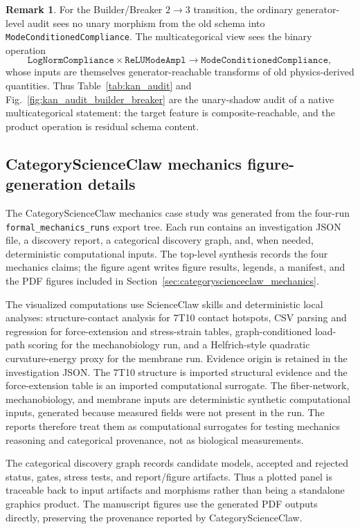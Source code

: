 \documentclass[11pt]{article}
\theoremstyle{definition}
\newtheorem{remark}{Remark}
\begin{document}
\begin{remark}
For the Builder/Breaker $2\to3$ transition, the ordinary generator-level audit sees no unary morphism from the old schema into \texttt{ModeConditionedCompliance}. The multicategorical view sees the binary operation
\[
\texttt{LogNormCompliance}\times\texttt{ReLUModeAmpl}
\longrightarrow \texttt{ModeConditionedCompliance},
\]
whose inputs are themselves generator-reachable transforms of old physics-derived quantities. Thus Table~\ref{tab:kan_audit} and Fig.~\ref{fig:kan_audit_builder_breaker} are the unary-shadow audit of a native multicategorical statement: the target feature is composite-reachable, and the product operation is residual schema content.
\end{remark}


\subsection{CategoryScienceClaw mechanics figure-generation details}
\label{sec:categoryscienceclaw_methods}

The CategoryScienceClaw mechanics case study was generated from the four-run \texttt{formal\_mechanics\_runs} export tree. Each run contains an investigation JSON file, a discovery report, a categorical discovery graph, and, when needed, deterministic computational inputs. The top-level synthesis records the four mechanics claims; the figure agent writes figure results, legends, a manifest, and the PDF figures included in Section~\ref{sec:categoryscienceclaw_mechanics}.

The visualized computations use ScienceClaw skills and deterministic local analyses: structure-contact analysis for 7T10 contact hotspots, CSV parsing and regression for force-extension and stress-strain tables, graph-conditioned load-path scoring for the mechanobiology run, and a Helfrich-style quadratic curvature-energy proxy for the membrane run. Evidence origin is retained in the investigation JSON. The 7T10 structure is imported structural evidence and the force-extension table is an imported computational surrogate. The fiber-network, mechanobiology, and membrane inputs are deterministic synthetic computational inputs, generated because measured fields were not present in the run. The reports therefore treat them as computational surrogates for testing mechanics reasoning and categorical provenance, not as biological measurements.

The categorical discovery graph records candidate models, accepted and rejected status, gates, stress tests, and report/figure artifacts. Thus a plotted panel is traceable back to input artifacts and morphisms rather than being a standalone graphics product. The manuscript figures use the generated PDF outputs directly, preserving the provenance reported by CategoryScienceClaw.
\end{document}
